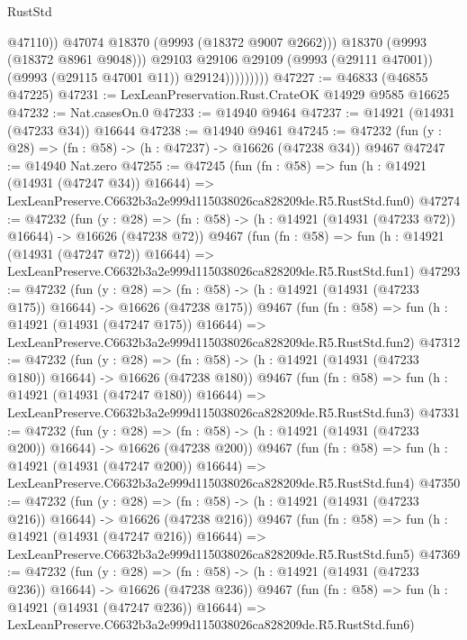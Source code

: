 \begin{lexlean}{RustStd}
\begin{coremodule}
                              @47110))
                          @47074
                          @18370
                          (@9993 (@18372 @9007 @2662)))
                        @18370
                        (@9993 (@18372 @8961 @9048)))
                      @29103
                      @29106
                      @29109
                      (@9993 (@29111 @47001))
                      (@9993 (@29115 @47001 @11))
                      @29124)))))))))
@47227 := @46833 (@46855 @47225)
@47231 := LexLeanPreservation.Rust.CrateOK @14929 @9585 @16625
@47232 := Nat.casesOn.{0}
@47233 := @14940 @9464
@47237 := @14921 (@14931 (@47233 @34)) @16644
@47238 := @14940 @9461
@47245 := @47232 (fun (y : @28) => (fn : @58) -> (h : @47237) -> @16626 (@47238 @34)) @9467
@47247 := @14940 Nat.zero
@47255 := @47245
    (fun (fn : @58) =>
    fun (h : @14921 (@14931 (@47247 @34)) @16644) =>
    LexLeanPreserve.C6632b3a2e999d115038026ca828209de.R5.RustStd.fun0)
@47274 := @47232
    (fun (y : @28) =>
    (fn : @58) -> (h : @14921 (@14931 (@47233 @72)) @16644) -> @16626 (@47238 @72))
    @9467
    (fun (fn : @58) =>
    fun (h : @14921 (@14931 (@47247 @72)) @16644) =>
    LexLeanPreserve.C6632b3a2e999d115038026ca828209de.R5.RustStd.fun1)
@47293 := @47232
    (fun (y : @28) =>
    (fn : @58) -> (h : @14921 (@14931 (@47233 @175)) @16644) -> @16626 (@47238 @175))
    @9467
    (fun (fn : @58) =>
    fun (h : @14921 (@14931 (@47247 @175)) @16644) =>
    LexLeanPreserve.C6632b3a2e999d115038026ca828209de.R5.RustStd.fun2)
@47312 := @47232
    (fun (y : @28) =>
    (fn : @58) -> (h : @14921 (@14931 (@47233 @180)) @16644) -> @16626 (@47238 @180))
    @9467
    (fun (fn : @58) =>
    fun (h : @14921 (@14931 (@47247 @180)) @16644) =>
    LexLeanPreserve.C6632b3a2e999d115038026ca828209de.R5.RustStd.fun3)
@47331 := @47232
    (fun (y : @28) =>
    (fn : @58) -> (h : @14921 (@14931 (@47233 @200)) @16644) -> @16626 (@47238 @200))
    @9467
    (fun (fn : @58) =>
    fun (h : @14921 (@14931 (@47247 @200)) @16644) =>
    LexLeanPreserve.C6632b3a2e999d115038026ca828209de.R5.RustStd.fun4)
@47350 := @47232
    (fun (y : @28) =>
    (fn : @58) -> (h : @14921 (@14931 (@47233 @216)) @16644) -> @16626 (@47238 @216))
    @9467
    (fun (fn : @58) =>
    fun (h : @14921 (@14931 (@47247 @216)) @16644) =>
    LexLeanPreserve.C6632b3a2e999d115038026ca828209de.R5.RustStd.fun5)
@47369 := @47232
    (fun (y : @28) =>
    (fn : @58) -> (h : @14921 (@14931 (@47233 @236)) @16644) -> @16626 (@47238 @236))
    @9467
    (fun (fn : @58) =>
    fun (h : @14921 (@14931 (@47247 @236)) @16644) =>
    LexLeanPreserve.C6632b3a2e999d115038026ca828209de.R5.RustStd.fun6)

\end{coremodule}
\end{lexlean}
